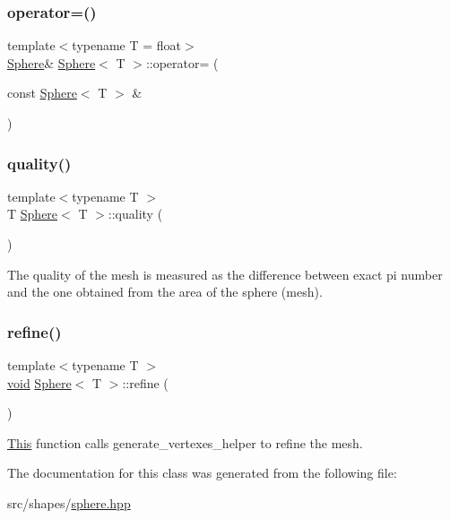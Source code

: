 \mbox{\label{classSphere_ae989d05c3ea71f5a758e90e2f2e3aecf}} 
\subsubsection{\texorpdfstring{operator=()}{operator=()}\hspace{0.1cm}{\footnotesize\ttfamily [2/2]}}
{\footnotesize\ttfamily template$<$typename T = float$>$ \\
\mbox{\hyperlink{classSphere}{Sphere}}\& \mbox{\hyperlink{classSphere}{Sphere}}$<$ T $>$\+::operator= (\begin{DoxyParamCaption}\item[{const \mbox{\hyperlink{classSphere}{Sphere}}$<$ T $>$ \&}]{ }\end{DoxyParamCaption})\hspace{0.3cm}{\ttfamily [default]}}

\mbox{\label{classSphere_a9ebc65dabaf8d87fbe599f4b64816f73}} 
\subsubsection{\texorpdfstring{quality()}{quality()}}
{\footnotesize\ttfamily template$<$typename T $>$ \\
T \mbox{\hyperlink{classSphere}{Sphere}}$<$ T $>$\+::quality (\begin{DoxyParamCaption}{ }\end{DoxyParamCaption})}



The quality of the mesh is measured as the difference between exact pi number and the one obtained from the area of the sphere (mesh). 

\mbox{\label{classSphere_a3f5ee2b07e48a360696fe983690d1d1f}} 
\subsubsection{\texorpdfstring{refine()}{refine()}}
{\footnotesize\ttfamily template$<$typename T $>$ \\
\mbox{\hyperlink{glad_8h_a950fc91edb4504f62f1c577bf4727c29}{void}} \mbox{\hyperlink{classSphere}{Sphere}}$<$ T $>$\+::refine (\begin{DoxyParamCaption}{ }\end{DoxyParamCaption})}



\mbox{\hyperlink{classThis}{This}} function calls generate\+\_\+vertexes\+\_\+helper to refine the mesh. 



The documentation for this class was generated from the following file\+:\begin{DoxyCompactItemize}
\item 
src/shapes/\mbox{\hyperlink{sphere_8hpp}{sphere.\+hpp}}\end{DoxyCompactItemize}
